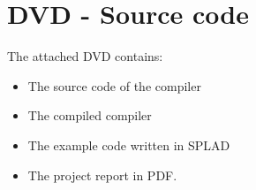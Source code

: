 \chapter{DVD - Source code}
\label{chap:appDVD}
The attached DVD contains:
	\begin{itemize}
		\item The source code of the compiler
		\item The compiled compiler
		\item The example code written in SPLAD
		\item The project report in PDF.
	\end{itemize}
